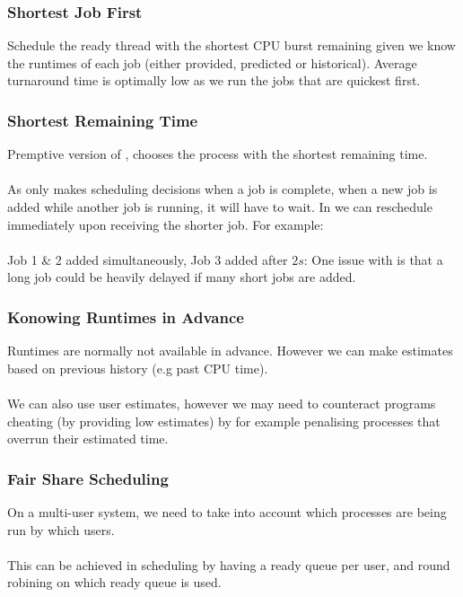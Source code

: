 \documentclass{report}
\begin{document}
        \subsubsection*{Shortest Job First}
            Schedule the ready thread with the shortest CPU burst remaining given we know the runtimes of each job (either provided, predicted or historical).
            Average turnaround time is optimally low as we run the jobs that are quickest first.
        \subsubsection*{Shortest Remaining Time}
            Premptive version of , chooses the process with the shortest remaining time.
            \\
            \\ As  only makes scheduling decisions when a job is complete, when a new job is added while another job is running, it will have to wait. In  we can reschedule immediately upon receiving the shorter job. For example:
            \\
            \\ Job 1 \& 2 added simultaneously, Job 3 added after $2s$:
            One issue with  is that a long job could be heavily delayed if many short jobs are added.
        \subsubsection*{Konowing Runtimes in Advance}
            Runtimes are normally not available in advance. However we can make estimates based on previous history (e.g past CPU time).
            \\
            \\ We can also use user estimates, however we may need to counteract programs cheating (by providing low estimates) by for example penalising processes that overrun their estimated time.
        \subsubsection*{Fair Share Scheduling}
            On a multi-user system, we need to take into account which processes are being run by which users.
            \\
            \\ This can be achieved in  scheduling by having a ready queue per user, and round robining on which ready queue is used.
\end{document}
